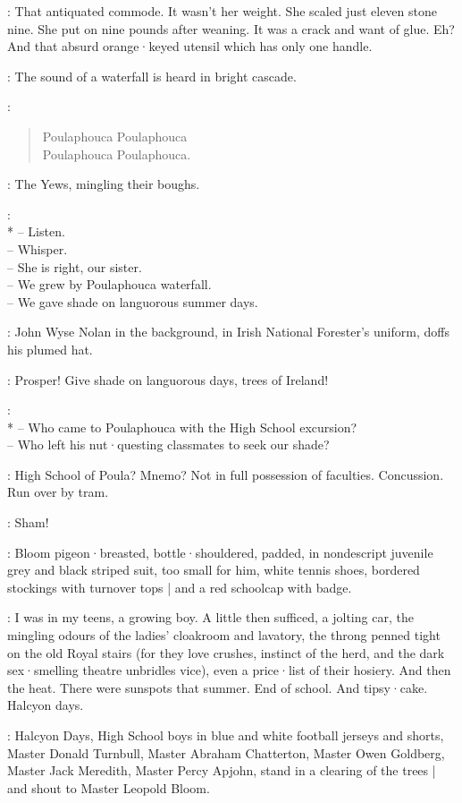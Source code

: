 \Bloom:
That antiquated commode.
It wasn't her weight.
She scaled just eleven stone nine.
She put on nine pounds after weaning.
It was a crack and want of glue.
Eh?
And that absurd orange·keyed utensil which has only one handle.

:
The sound of a waterfall is heard in bright cascade.

\Waterfall:
\begin{verse}
    Poulaphouca Poulaphouca\\
%
    Poulaphouca Poulaphouca.
\end{verse}

:
The Yews,
mingling their boughs.

\Yews:\\*
-- Listen.\\
-- Whisper.\\
-- She is right, our sister.\\
-- We grew by Poulaphouca waterfall.\\
-- We gave shade on languorous summer days.

:
John Wyse Nolan in the background,
in Irish National Forester's uniform,
doffs his plumed hat.

\JohnWyse:
Prosper!
Give shade on languorous days,
trees of Ireland!

\Yews:
\\*
-- Who came to Poulaphouca with the High School excursion?\\
-- Who left his nut·questing classmates to seek our shade?

\Bloom:
High School of Poula?
Mnemo?
Not in full possession of faculties.
Concussion.
Run over by tram.

\Echo:
Sham!

:
Bloom pigeon·breasted,
bottle·shouldered,
padded,
in nondescript juvenile grey and black striped suit,
too small for him,
white tennis shoes,
bordered stockings with turnover tops |
and a red schoolcap with badge.

\Bloom:
I was in my teens,
a growing boy.
A little then sufficed,
a jolting car,
the mingling odours of the ladies' cloakroom and lavatory,
%
the throng penned tight on the old Royal stairs
(for they love crushes,
instinct of the herd,
and the dark sex·smelling theatre unbridles vice),
even a price·list of their hosiery.
And then the heat.
There were sunspots that summer.
End of school.
And tipsy·cake.
Halcyon days.

:
Halcyon Days,
High School boys in blue and white football jerseys and shorts,
Master Donald Turnbull,
Master Abraham Chatterton,
Master Owen Goldberg,
Master Jack Meredith,
Master Percy Apjohn,
stand in a clearing of the trees |
and shout to Master Leopold Bloom.

